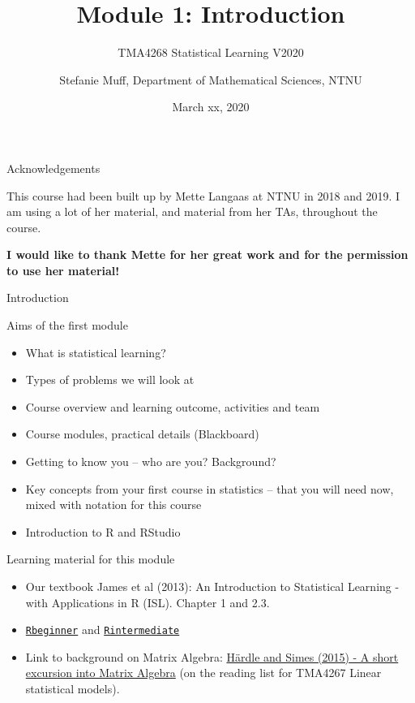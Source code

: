 \documentclass[10pt,ignorenonframetext,]{beamer}
\title{Module 1: Introduction}
\subtitle{TMA4268 Statistical Learning V2020}
\author{Stefanie Muff, Department of Mathematical Sciences, NTNU}
\date{March xx, 2020}
\begin{document}
\frame{\titlepage}

\begin{frame}{Acknowledgements}

This course had been built up by Mette Langaas at NTNU in 2018 and 2019.
I am using a lot of her material, and material from her TAs, throughout
the course.

\textbf{I would like to thank Mette for her great work and for the
permission to use her material!}

\end{frame}

\begin{frame}{Introduction}

\begin{block}{Aims of the first module}

\begin{itemize}
\item
  What is statistical learning?
\item
  Types of problems we will look at
\item
  Course overview and learning outcome, activities and team
\item
  Course modules, practical details (Blackboard)
\item
  Getting to know you -- who are you? Background?
\item
  Key concepts from your first course in statistics -- that you will
  need now, mixed with notation for this course
\item
  Introduction to R and RStudio\\
\end{itemize}

\end{block}

\end{frame}

\begin{frame}

\begin{block}{Learning material for this module}

\begin{itemize}
\item
  Our textbook James et al (2013): An Introduction to Statistical
  Learning - with Applications in R (ISL). Chapter 1 and 2.3.
\item
  \href{https://www.math.ntnu.no/emner/TMA4268/2019v/1Intro/Rbeginner.html}{\texttt{Rbeginner}}
  and
  \href{https://www.math.ntnu.no/emner/TMA4268/2019v/1Intro/Rintermediate.html}{\texttt{Rintermediate}}
\item
  Link to background on Matrix Algebra:
  \href{https://link.springer.com/chapter/10.1007/978-3-662-45171-7_2}{Härdle
  and Simes (2015) - A short excursion into Matrix Algebra} (on the
  reading list for TMA4267 Linear statistical models).
\end{itemize}

\end{block}

\end{frame}
\end{document}
